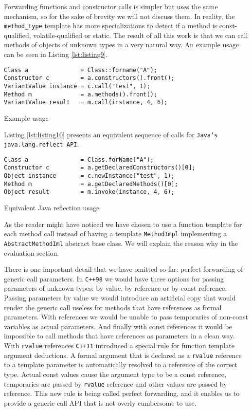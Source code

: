 Forwarding functions and constructor calls is simpler but uses the same mechanism, so for the sake of brevity we will not discuss them.
In reality, the \texttt{method\_type} template has more specializations to detect if a method is const-qualified, volatile-qualified or static.
The result of all this work is that we can call methods of objects of unknown types in a very natural way. An example usage can be seen in Listing
\ref{lst:listing9}.


\begin{listing}[H]
\begin{verbatim}
Class a               = Class::forname("A");
Constructor c         = a.constructors().front();
VariantValue instance = c.call("test", 1);
Method m              = a.methods().front();
VariantValue result   = m.call(instance, 4, 6);
\end{verbatim}
\caption{Example usage}
\label{lst:listing9}
\end{listing}

Listing \ref{lst:listing10} presents an equivalent sequence of calls for \texttt{Java's java.lang.reflect API}.


\begin{listing}[H]
\begin{verbatim}
Class a               = Class.forName("A");
Constructor c         = a.getDeclaredConstructors()[0];
Object instance       = c.newInstance("test", 1);
Method m              = a.getDeclaredMethods()[0];
Object result         = m.invoke(instance, 4, 6);
\end{verbatim}
\caption{Equivalent Java reflection usage}
\label{lst:listing10}
\end{listing}

As the reader might have noticed we have chosen to use a function template for each method call instead of having a template \texttt{MethodImpl}
implementing a \texttt{AbstractMethodIml} abstract base class. We will explain the reason why in the evaluation section.

There is one important detail that we have omitted so far: perfect forwarding of generic call parameters. In \texttt{C++98}
we would have three options for passing parameters of unknown types: by value, by reference or by const reference. Passing
parameters by value we would introduce an artificial copy that would render the generic call useless for methods that
have references as formal parameters. With references we would be unable to pass temporaries of non-const variables as
actual parameters. And finally with const references it would be impossible to call methods that have references as parameters
in a clean way. With \texttt{rvalue} references \texttt{C++11} introduced a special rule for function template argument deductions.
A formal argument that is declared as a \texttt{rvalue} reference to a template parameter is automatically resolved to a reference
of the correct type. Actual const values cause the argument type to be a const reference, temporaries are passed by \texttt{rvalue}
reference and other values are passed by reference. This new rule is being called perfect forwarding, and it enables us to
provide a generic call API that is not overly cumbersome to use.

